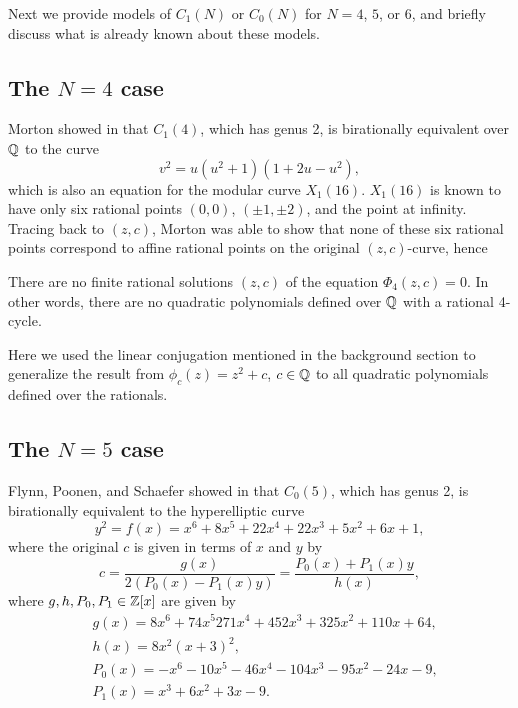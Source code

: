 Next we provide models of $C_1(N)$ or $C_0(N)$ for $N = 4$, $5$, or
$6$, and briefly discuss what is already known about these models.

\subsection{The $N = 4$ case}
\label{subsec:model-4}

Morton showed in \cite{MR1665198} that $C_1(4)$, which has genus 2, is
birationally equivalent over $\mathbb{Q}$ to the curve
\begin{equation}
  \label{eq:c1(4)}
  v^2 = u(u^2 + 1)(1 + 2u - u^2),
\end{equation}
which is also an equation for the modular curve $X_1(16)$. $X_1(16)$
is known to have only six rational points $(0, 0)$, $(\pm 1, \pm 2)$,
and the point at infinity. Tracing back to $(z, c)$, Morton was able
to show that none of these six rational points correspond to affine
rational points on the original $(z, c)$-curve, hence

\begin{theorem}
  There are no finite rational solutions $(z, c)$ of the equation
  $\Phi_4(z, c) = 0$. In other words, there are no quadratic
  polynomials defined over $\mathbb{Q}$ with a rational 4-cycle.
\end{theorem}

\begin{remark}
  Here we used the linear conjugation mentioned in the background
  section to generalize the result from $\phi_c(z) = z^2 + c$, $c \in
  \mathbb{Q}$ to all quadratic polynomials defined over the rationals.
\end{remark}

\subsection{The $N = 5$ case}
\label{subsec:model-5}

Flynn, Poonen, and Schaefer showed in \cite{MR1480542} that $C_0(5)$,
which has genus 2, is birationally equivalent to the hyperelliptic
curve
\begin{equation}
  \label{eq:c0(5)}
  y^2 = f(x) = x^6 + 8x^5 + 22x^4 + 22x^3 + 5x^2 + 6x + 1,
\end{equation}
where the original $c$ is given in terms of $x$ and $y$ by
\begin{equation}
  \label{eq:c-in-xy}
  c = \frac{g(x)}{2(P_0(x) - P_1(x) y)}
  = \frac{P_0(x) + P_1(x) y}{h(x)},
\end{equation}
where $g, h, P_0, P_1 \in \mathbb{Z}[x]$ are given by
\begin{subequations}
  \label{eq:poly-defs}
  \begin{align}
    & g(x) = 8x^6 + 74x^5 271x^4 + 452x^3 + 325x^2 + 110x + 64,\\
    & h(x) = 8x^2(x+3)^2,\\
    & P_0(x) = - x^6 - 10x^5 - 46x^4 - 104x^3 - 95x^2 - 24x - 9,\\
    & P_1(x) = x^3 + 6x^2 + 3x - 9.
  \end{align}
\end{subequations}

